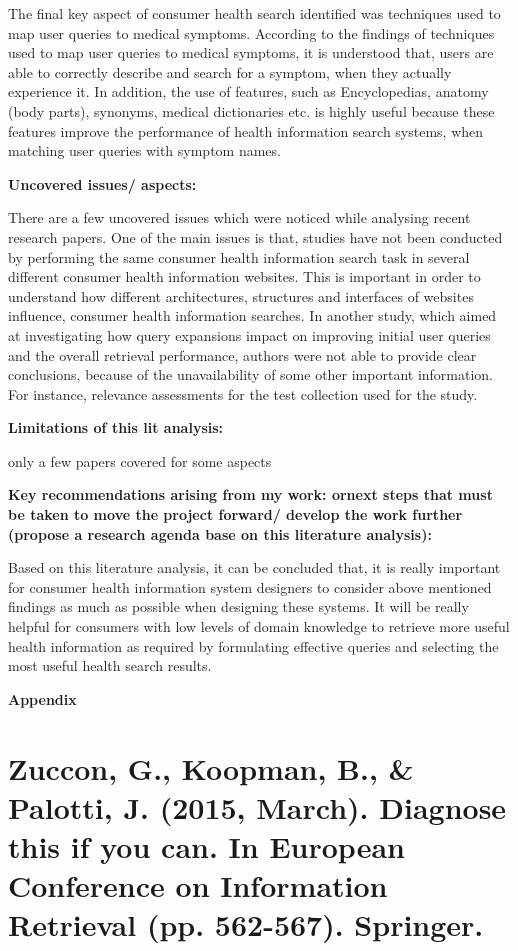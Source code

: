 \documentclass[]{article}
\begin{document}
The final key aspect of consumer health search identified was techniques used to map user queries to medical symptoms. According to the findings of techniques used to map user queries to medical symptoms, it is understood that, users are able to correctly describe and search for a symptom, when they actually experience it. In addition, the use of features, such as Encyclopedias, anatomy (body parts), synonyms, medical dictionaries etc. is highly useful because these features improve the performance of health information search systems, when matching user queries with symptom names.      

\textbf{Uncovered issues/ aspects:}  

There are a few uncovered issues which were noticed while analysing recent research papers. One of the main issues is that, studies have not been conducted by performing the same consumer health information search task in several different consumer health information websites. This is important in order to understand how different architectures, structures and interfaces of websites influence, consumer health information searches. In another study, which aimed at investigating how query expansions impact on improving initial user queries and the overall retrieval performance, authors were not able to provide clear conclusions, because of the unavailability of some other important information. For instance, relevance assessments for the test collection used for the study.   


\textbf{Limitations of this lit analysis:}

only a few papers covered for some aspects


\textbf{Key recommendations arising from my work: ornext steps that must be taken to move the project forward/ develop the work further (propose a research agenda base on this literature analysis): }

Based on this literature analysis, it can be concluded that, it is really important for consumer health information system designers to consider above mentioned findings as much as possible when designing these systems. It will be really helpful for consumers with low levels of domain knowledge to retrieve more useful health information as required by formulating effective queries and selecting the most useful health search results. 

\textbf{Appendix} 

\section{Zuccon, G., Koopman, B., \& Palotti, J. (2015, March). Diagnose this if you can. In European Conference on Information Retrieval (pp. 562-567). Springer.}
\end{document}
